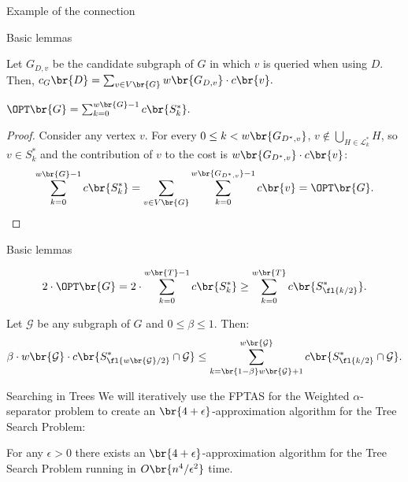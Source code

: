 \begin{frame}{Example of the connection}

\end{frame}

\begin{frame}{Basic lemmas}
\begin{lemma}\label{contributionLemma}
Let $G_{D,v}$ be the candidate subgraph of $G$ in which 
$v$ is queried when using $D$. Then,
$
c_G\br{D} = \sum_{v \in V\br{G}} w\br{G_{D,v}} \cdot c\br{v}.
$
\end{lemma}
    \pause
\begin{lemma}
    $\OPT\br{G}=\sum_{k=0}^{w\br{G}-1}c\br{S_{k}^*}.$
    \pause
    \begin{proof}
        Consider any vertex $v$. For every $0\leq k<w\br{G_{D^*,v}}$, $v\notin \bigcup_{H\in \mathcal{L}_{k}^*}H$, so $v\in S_{k}^*$ and the contribution of $v$ to the cost is $w\br{G_{D^*,v}}\cdot c\br{v}$:
        $$\sum_{k=0}^{w\br{G}-1}c\br{S_{k}^*}=\sum_{v\in V\br{G}}\sum_{k=0}^{w\br{G_{D^*,v}}-1}c\br{v}=\OPT\br{G}.$$
    \end{proof}
\end{lemma}
\end{frame}

\begin{frame}{Basic lemmas}
\begin{lemma}\label{lb_opt}
    $$
    2\cdot\OPT\br{G}= 2\cdot\sum_{k=0}^{w\br{T}-1}c\br{S_{k}^*} \geq \sum_{k=0}^{w\br{T}}c\br{S_{\fl{k/2}}^*}.
    $$
\end{lemma}
    \pause
\begin{lemma}\label{splitting}
    Let $\mathcal{G}$ be any subgraph of $G$ and $0\leq\beta\leq 1$. Then: 
            $$
           \beta\cdot w\br{\mathcal{G}}\cdot c\br{S_{\fl{w\br{\mathcal{G}}/2}}^*\cap \mathcal{G}}
            \leq \sum_{k=\br{1-\beta}w\br{\mathcal{G}}+1}^{w\br{\mathcal{G}}}c\br{S_{\fl{k/2}}^*\cap \mathcal{G}}.
            $$
\end{lemma}
\end{frame}

\begin{frame}{Searching in Trees}
We will iteratively use the FPTAS for the Weighted $\alpha$-separator problem to create an $\br{4+\epsilon}$-approximation algorithm for the Tree Search Problem:
\pause
\begin{theorem}
    For any $\epsilon>0$ there exists an $\br{4+\epsilon}$-approximation algorithm for the Tree Search Problem running in $O\br{n^4/\epsilon^2}$ time.
\end{theorem}
    
\end{frame}

